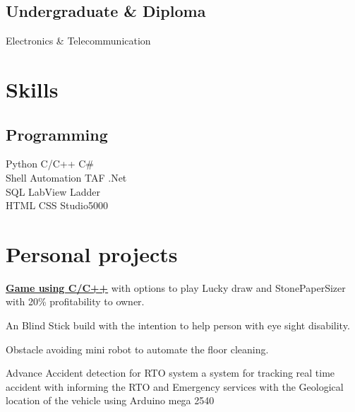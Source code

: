 \documentclass[]{d}
\begin{document}
\begin{minipage}[t]{0.33\textwidth}
\subsection{Undergraduate \& Diploma}
Electronics \& Telecommunication 
\sectionsep


\section{Skills}
\subsection{Programming}
Python \textbullet{}   C/C++ \textbullet{} 
C\# \\ \textbullet{} Shell 
Automation \textbullet{} 
TAF \textbullet{}   .Net\\ 
SQL \textbullet{} LabView \textbullet{} Ladder \\ \textbullet{} HTML \textbullet{} CSS \textbullet{} Studio5000
\sectionsep

\section{Personal projects}
\begin{tightemize}
\vspace{\topsep} %

\item \href{https://github.com/Manishsakpal/M1_Gaming_LuckyDraw-}
{{\bf Game using C/C++}} with options to play Lucky draw and StonePaperSizer with 20\% profitability to owner.
\item { An Blind Stick build with the intention to help person with eye sight disability. }
\item { Obstacle avoiding mini robot to automate the floor cleaning. }
\item {Advance Accident detection for RTO system a system for tracking real time accident with informing 
the RTO and Emergency services with the Geological location of the vehicle using Arduino mega 2540}
\end{tightemize}

%
%

\end{minipage} 
\end{document}
